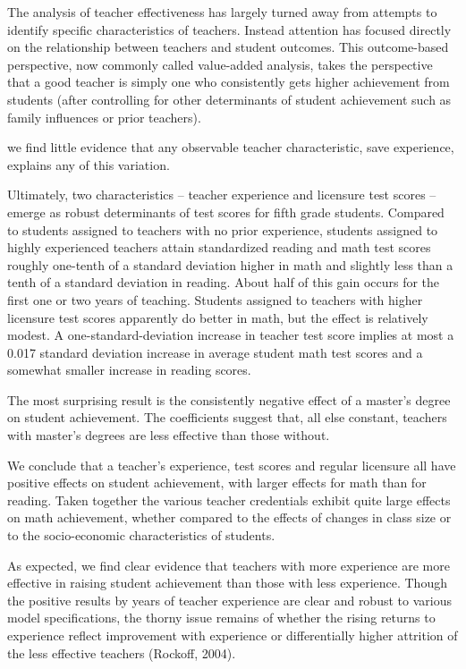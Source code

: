The analysis of teacher effectiveness has largely turned away from attempts to identify
specific characteristics of teachers. Instead attention has focused directly on the relationship between teachers and student outcomes. This outcome-based perspective, now commonly called value-added analysis, takes the perspective that a good teacher is simply one
who consistently gets higher achievement from students (after controlling for other determinants of student achievement such as family influences or prior teachers). \citep{Hanushek_et_al_2012}


we find little evidence that any observable teacher characteristic, save experience, explains any of this variation. \citep{Clotfelter_et_al_2006}


Ultimately, two characteristics – teacher experience and licensure test scores – emerge as robust determinants of test scores for fifth grade students. Compared to students assigned to
teachers with no prior experience, students assigned to highly experienced teachers attain standardized reading and math test scores roughly one-tenth of a standard deviation higher in math and slightly less than a tenth of a standard deviation in reading. About half of this gain occurs for the first one or two years of teaching. Students assigned to teachers with higher licensure test scores apparently do better in math, but the effect is relatively modest. A one-standard-deviation increase in teacher test score implies at most a 0.017 standard deviation increase in average student math test scores and a somewhat smaller increase in reading scores. \citep{Clotfelter_et_al_2006}


The most surprising result is the consistently negative effect of a master’s degree on student achievement. The coefficients suggest that, all else constant, teachers with master’s degrees are less effective than those without. \citep{Clotfelter_et_al_2006}


We conclude that a teacher’s experience, test scores and regular licensure all have positive effects on student achievement, with larger effects for math than for reading. Taken together the various teacher credentials exhibit quite large effects on math achievement, whether compared to the effects of changes in class size or to the socio-economic characteristics of students. \citep{Clotfelter_et_al_2007}


As expected, we find clear evidence that teachers with more experience are more effective in raising student achievement than those with less experience. Though the positive results by years of teacher experience are clear and robust to various model specifications, the thorny issue remains of whether the rising returns to experience reflect improvement with experience or differentially higher attrition of the less effective teachers (Rockoff, 2004). 

